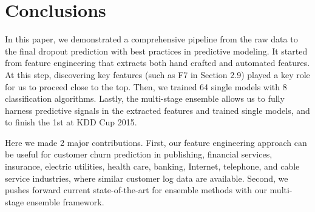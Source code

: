 \section{Conclusions}
In this paper, we demonstrated a comprehensive pipeline from the raw data to the final dropout prediction with best practices in  predictive modeling.  It started from feature engineering that extracts both hand crafted and automated features.  At this step, discovering key features (such as F7 in Section 2.9) played a key role for us to proceed close to the top. Then, we trained 64 single models with 8 classification algorithms. Lastly, the multi-stage ensemble allows us to fully harness predictive signals in the extracted features and trained single models, and to finish the 1st at KDD Cup 2015.

Here we made 2 major contributions.  First, our feature engineering approach can be useful for customer churn prediction in publishing, financial services, insurance, electric utilities, health care, banking, Internet, telephone, and cable service industries, where similar customer log data are available.  Second, we pushes forward current state-of-the-art for ensemble methods with our multi-stage ensemble framework.